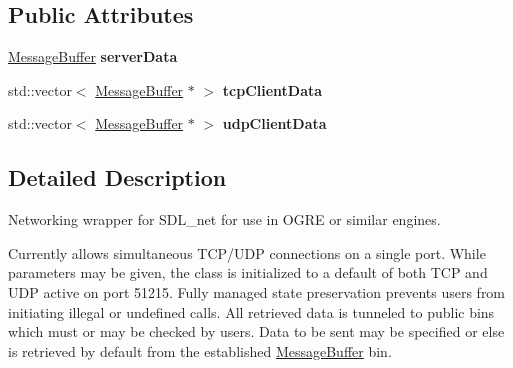 \subsection*{Public Attributes}
\begin{DoxyCompactItemize}
\item 
\hypertarget{classNetManager_a6b14ccec08283da5ae5e8b4750fc1570}{\hyperlink{structMessageBuffer}{Message\-Buffer} {\bfseries server\-Data}}\label{classNetManager_a6b14ccec08283da5ae5e8b4750fc1570}

\item 
\hypertarget{classNetManager_a649bc5ea5a88c73f9f29a98e9e2fa0e7}{std\-::vector$<$ \hyperlink{structMessageBuffer}{Message\-Buffer} $\ast$ $>$ {\bfseries tcp\-Client\-Data}}\label{classNetManager_a649bc5ea5a88c73f9f29a98e9e2fa0e7}

\item 
\hypertarget{classNetManager_a69971bac76c80f177e6370a71fe31443}{std\-::vector$<$ \hyperlink{structMessageBuffer}{Message\-Buffer} $\ast$ $>$ {\bfseries udp\-Client\-Data}}\label{classNetManager_a69971bac76c80f177e6370a71fe31443}

\end{DoxyCompactItemize}


\subsection{Detailed Description}
Networking wrapper for S\-D\-L\-\_\-net for use in O\-G\-R\-E or similar engines. 

Currently allows simultaneous T\-C\-P/\-U\-D\-P connections on a single port. While parameters may be given, the class is initialized to a default of both T\-C\-P and U\-D\-P active on port 51215. Fully managed state preservation prevents users from initiating illegal or undefined calls. All retrieved data is tunneled to public bins which must or may be checked by users. Data to be sent may be specified or else is retrieved by default from the established \hyperlink{structMessageBuffer}{Message\-Buffer} bin. 

